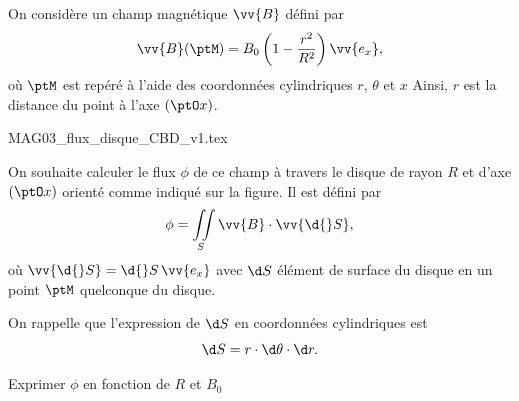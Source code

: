                                 \initialisationPartieGauche %
 
On considère un champ magnétique $\vv{B}$ défini par 
\[
\vv{B}(\ptM)=B_0 \left(1-\dfrac{r^2}{R^2} \right)\vv{e_x},
\]
 où $\ptM$ est repéré à l'aide des coordonnées cylindriques $r$, $\theta$ et $x$ Ainsi, $r$ est la distance du point à l'axe $(\ptO x)$.


                                \initialisationPartieDroite %
% 
\begin{center}
{MAG03_flux_disque_CBD_v1.tex}
\end{center}                                                          %
% 

                               \finalisationDuPartageDePage %

\smallskip

On souhaite calculer le flux $\phi$ de ce champ à travers le disque de rayon $R$ et d'axe $(\ptO x)$  orienté comme indiqué sur la figure. Il est défini par
\[
\phi=\iint\limits_S \vv{B} \cdot \vv{\d{} S},
\]
où
$\vv{\d{} S}=\d{} S\,\vv{e_x}$ avec $\d S$ élément de surface du disque en un point $\ptM$ quelconque du disque.

\smallskip

On rappelle que l'expression de $\d S$ en coordonnées cylindriques est 
\[
\d S= r \cdot \d \theta\cdot \d r.
\]



\begin{enonce}
Exprimer $\phi$ en fonction de $R$ et $B_0$
\end{enonce}

